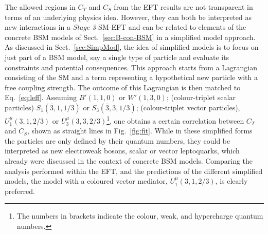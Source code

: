 The allowed regions in $C_T$ and $C_S$ from the EFT results are not
transparent in terms of an underlying physics idea. However,
they can both be
interpreted as new interactions in a \emph{Stage 3} SM-EFT and can be related
to elements of the concrete BSM models of Sect.~\ref{sec:B-con-BSM} in
a simplified model approach.  As discussed in Sect.~\ref{sec:SimpMod},
the idea of simplified models is to focus on just part of a BSM model, say a
single type of particle and evaluate its constraints and potential
consequences. This approach starts from a Lagrangian consisting of the
SM and a term representing a hypothetical new particle with a free
coupling strength.  The outcome of this Lagrangian is then matched to
Eq.~\ref{eq:leff}.
Assuming $B'(1,1,0)$ or $W'(1,3,0)$; (colour-triplet scalar particles)
$S_1(\bar{3},1,1/3)$ or $S_3(\bar{3},3,1/3)$; (colour-triplet vector
particles), $U_1^\mu(3,1,2/3)$ or $U_3^\mu(3,3,2/3)$\footnote{The
  numbers in brackets indicate the colour, weak, and hypercharge
  quantum numbers.}, one obtains a certain correlation between $C_T$
and $C_S$, shown as straight lines in Fig.~\ref{fig:fit}.  While in
these simplified forms the particles are only defined by their quantum
numbers, they could be interpreted as new electroweak bosons, scalar
or vector leptoquarks, which already were discussed in the context of
concrete BSM models.  Comparing the analysis performed within the
EFT, and the predictions of the different
simplified models, the model with a coloured vector mediator,
$U_1^\mu(3,1,2/3)$, is clearly preferred. 

